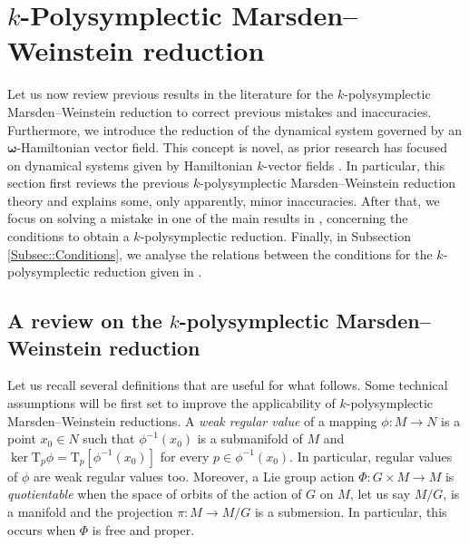 \documentclass[11pt]{article}
\theoremstyle{plain}
\theoremstyle{definition}
\newcommand{\T}{\mathrm{T}}
\newcommand{\bomega}{{\boldsymbol{\omega}}}
\numberwithin{equation}{section}
\begin{document}
\section{\texorpdfstring{$k$}{}-Polysymplectic Marsden--Weinstein reduction}\label{Sec::reduction}

Let us now review previous results in the literature for the $k$-polysymplectic Marsden--Weinstein reduction to correct previous mistakes and inaccuracies. Furthermore, we introduce the reduction of the dynamical system governed by an $\bomega$-Hamiltonian vector field. This concept is novel, as prior research has focused on dynamical systems given by Hamiltonian $k$-vector fields \cite{Bla_19, MRSV_15}. In particular, this section  first reviews the previous $k$-polysymplectic Marsden--Weinstein reduction theory and explains some, only apparently, minor inaccuracies. After that, we focus on solving a mistake in one of the main results in \cite{GM_23}, concerning the conditions to obtain a $k$-polysymplectic reduction. Finally, in Subsection \ref{Subsec::Conditions}, we analyse the relations between the conditions for the $k$-polysymplectic reduction given in \cite{MRSV_15}.

\subsection{A review on the \texorpdfstring{$k$}{}-polysymplectic Marsden--Weinstein reduction}
Let us recall several definitions that are useful for what follows. Some technical assumptions will be first set to improve the applicability of $k$-polysymplectic Marsden--Weinstein reductions. A {\it weak regular value} of a mapping $\phi:M\rightarrow N$ is a point $x_0\in N$ such that $\phi^{-1}(x_0)$ is a submanifold of $M$ and $\ker \T_p\phi = \T_p[\phi^{-1}(x_0)]$ for every $p\in \phi^{-1}(x_0)$. In particular, regular values of $\phi$ are weak regular values too. Moreover, a Lie group action $\Phi: G\times M\rightarrow M$ is {\it quotientable} \cite{Alb_89} when the space of orbits of the action of $G$ on $M$, let us say $M/G$, is a manifold and the projection $\pi: M\rightarrow M/G$ is a submersion. In particular, this occurs when $\Phi$ is free and proper.
\end{document}
